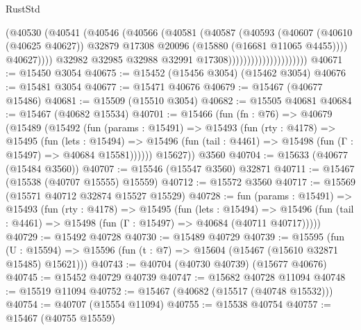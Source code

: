 \begin{lexlean}{RustStd}
\begin{coremodule}
                                          (@40530
                                            (@40541
                                              (@40546
                                                (@40566
                                                  (@40581
                                                    (@40587
                                                      (@40593
                                                        (@40607
                                                          (@40610 (@40625 @40627))
                                                          @32879
                                                          @17308
                                                          @20096
                                                          (@15880 (@16681 @11065 @4455))))
                                                      @40627))))
                                              @32982
                                              @32985
                                              @32988
                                              @32991
                                              @17308)))))))))))))))))))))
@40671 := @15450 @3054
@40675 := @15452 (@15456 @3054) (@15462 @3054)
@40676 := @15481 @3054
@40677 := @15471 @40676
@40679 := @15467 (@40677 @15486)
@40681 := @15509 (@15510 @3054)
@40682 := @15505 @40681
@40684 := @15467 (@40682 @15534)
@40701 := @15466
    (fun (fn : @76) =>
    @40679
      (@15489
        (@15492
          (fun (params : @15491) =>
          @15493
            (fun (rty : @4178) =>
            @15495
              (fun (lets : @15494) =>
              @15496 (fun (tail : @4461) => @15498 (fun (Γ : @15497) => @40684 @15581))))))
        @15627))
    @3560
@40704 := @15633 (@40677 (@15484 @3560))
@40707 := @15546 (@15547 @3560) @32871
@40711 := @15467 (@15538 (@40707 @15555) @15559)
@40712 := @15572 @3560
@40717 := @15569 (@15571 @40712 @32874 @15527 @15529)
@40728 := fun (params : @15491) =>
  @15493
    (fun (rty : @4178) =>
    @15495
      (fun (lets : @15494) =>
      @15496 (fun (tail : @4461) => @15498 (fun (Γ : @15497) => @40684 (@40711 @40717)))))
@40729 := @15492 @40728
@40730 := @15489 @40729
@40739 := @15595
    (fun (U : @15594) => @15596 (fun (t : @7) => @15604 (@15467 (@15610 @32871 @15485) @15621)))
@40743 := @40704 (@40730 @40739) (@15677 @40676)
@40745 := @15452 @40729 @40739
@40747 := @15682 @40728 @11094
@40748 := @15519 @11094
@40752 := @15467 (@40682 (@15517 (@40748 @15532)))
@40754 := @40707 (@15554 @11094)
@40755 := @15538 @40754
@40757 := @15467 (@40755 @15559)

\end{coremodule}
\end{lexlean}
